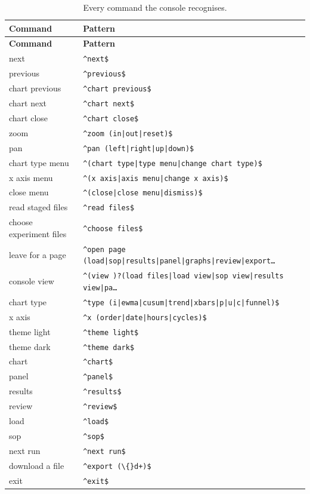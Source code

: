 {\small
\begin{longtable}{@{}ll@{}}
\caption{Every command the console recognises.}\label{tab:console-commands} \\
\toprule \textbf{Command} & \textbf{Pattern} \\\midrule\endfirsthead
\toprule \textbf{Command} & \textbf{Pattern} \\\midrule\endhead
next & \texttt{\textasciicircum{}next\$} \\
previous & \texttt{\textasciicircum{}previous\$} \\
chart previous & \texttt{\textasciicircum{}chart previous\$} \\
chart next & \texttt{\textasciicircum{}chart next\$} \\
chart close & \texttt{\textasciicircum{}chart close\$} \\
zoom & \texttt{\textasciicircum{}zoom (in|out|reset)\$} \\
pan & \texttt{\textasciicircum{}pan (left|right|up|down)\$} \\
chart type menu & \texttt{\textasciicircum{}(chart type|type menu|change chart type)\$} \\
x axis menu & \texttt{\textasciicircum{}(x axis|axis menu|change x axis)\$} \\
close menu & \texttt{\textasciicircum{}(close|close menu|dismiss)\$} \\
read staged files & \texttt{\textasciicircum{}read files\$} \\
choose experiment files & \texttt{\textasciicircum{}choose files\$} \\
leave for a page & \texttt{\textasciicircum{}open page (load|sop|results|panel|graphs|review|export…} \\
console view & \texttt{\textasciicircum{}(view )?(load files|load view|sop view|results view|pa…} \\
chart type & \texttt{\textasciicircum{}type (i|ewma|cusum|trend|xbars|p|u|c|funnel)\$} \\
x axis & \texttt{\textasciicircum{}x (order|date|hours|cycles)\$} \\
theme light & \texttt{\textasciicircum{}theme light\$} \\
theme dark & \texttt{\textasciicircum{}theme dark\$} \\
chart & \texttt{\textasciicircum{}chart\$} \\
panel & \texttt{\textasciicircum{}panel\$} \\
results & \texttt{\textasciicircum{}results\$} \\
review & \texttt{\textasciicircum{}review\$} \\
load & \texttt{\textasciicircum{}load\$} \\
sop & \texttt{\textasciicircum{}sop\$} \\
next run & \texttt{\textasciicircum{}next run\$} \\
download a file & \texttt{\textasciicircum{}export (\textbackslash\{\}d+)\$} \\
exit & \texttt{\textasciicircum{}exit\$} \\
\bottomrule
\end{longtable}}


